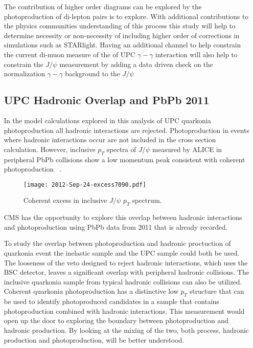       The contribution of higher order diagrams can be explored by the 
  photoproduction of di-lepton pairs is to explore.
      With additional contributions to the physics communities understanding of 
  this process this study will help to determine necessity or 
  non-necessity of including higher order of corrections in simulations 
  such as STARlight.
      Having an additional channel to help constrain the current di-muon measure 
  of the of UPC $\gamma-\gamma$ interaction will also help to constrain 
  the $J/\psi$ measurement by adding a data driven check on the 
  normalization $\gamma-\gamma$ background to the $J/\psi$
      
    \subsection{UPC Hadronic Overlap and PbPb 2011}
      In the model calculations explored in this analysis of UPC quarkonia 
        photoproduction all hadronic interactions are rejected.
      Photoproduction in events where hadronic interactions occur are not 
        included in the cross section calculation.
      However, inclusive $p_{T}$ spectra of $J/\psi$ measured by ALICE in 
        peripheral PbPb collisions show a low momentum peak consistent with 
        coherent photoproduction ~\cite{aliceIclJpsi}.
      \begin{figure}[h]
        \centering
        \texttt{[image: 2012-Sep-24-excess7090.pdf]}
        \caption{Coherent excess in inclusive $J/\psi$ $p_{T}$ spectrum.}
        \label{fig:alicePtSpecLowPt}
      \end{figure}
      CMS has the opportunity to explore this overlap between hadronic 
        interactions and photoproduction using PbPb data from 2011 that is 
        already recorded.

      To study the overlap between photoproduction and hadronic proctuction of 
        quarkonia event the inelastic sample and the UPC sample could both be
        used. 
      The looseness of the veto designed to reject hadronic interactions,
        which uses the BSC detector, leaves a significant overlap with 
        peripheral hadronic collisions. 
      The inclusive quarkonia sample from typical hadronic collisions can also 
        be utilized. 
      Coherent quarkonia photoproduction has a distinctive low $p_{T}$ structure
        that can be used to identify photoproduced candidates in a sample that 
        contains photoproduction combined with hadronic interactions.
      This measurement would open up the door to exploring the boundary between
        photoproduction and hadronic production.
      By looking at the mixing of the two, both process, hadronic production and 
        photoproduction, will be better understood.


